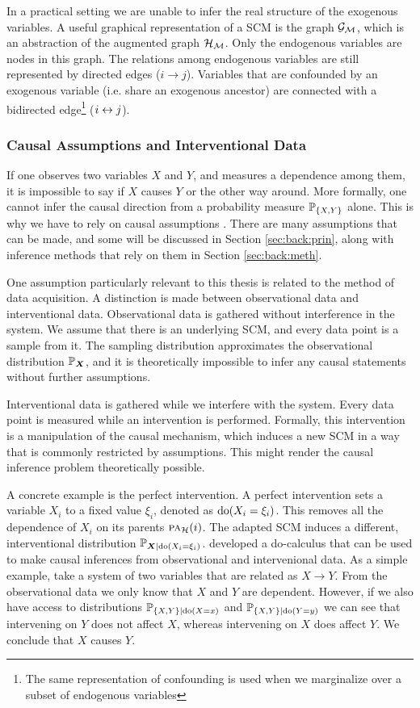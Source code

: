 In a practical setting we are unable to infer the real structure of the exogenous variables. A useful graphical representation of a SCM is the graph $\mathcal{G}_{\mathcal{M}}$, which is an abstraction of the augmented graph $\mathcal{H}_{\mathcal{M}}$. Only the endogenous variables are nodes in this graph. The relations among endogenous variables are still represented by directed edges ($i \to j$). Variables that are confounded by an exogenous variable (i.e. share an exogenous ancestor) are connected with a bidirected edge\footnote{The same representation of confounding is used when we marginalize over a subset of endogenous variables} ($i\leftrightarrow j$).

\subsubsection{Causal Assumptions and Interventional Data}
If one observes two variables $X$ and $Y$, and measures a dependence among them, it is impossible to say if $X$ causes $Y$ or the other way around. More formally, one cannot infer the causal direction from a probability measure $\mathbb{P}_{\{X,Y\}}$ alone. This is why we have to rely on causal assumptions \citep{pearl2009causality}. There are many assumptions that can be made, and some will be discussed in Section \ref{sec:back:prin}, along with inference methods that rely on them in Section \ref{sec:back:meth}. 

One assumption particularly relevant to this thesis is related to the method of data acquisition. A distinction is made between observational data and interventional data. Observational data is gathered without interference in the system. We assume that there is an underlying SCM, and every data point is a sample from it. The sampling distribution approximates the observational distribution $\mathbb{P}_{\bm{X}}$, and it is theoretically impossible to infer any causal statements without further assumptions. 

Interventional data is gathered while we interfere with the system. Every data point is measured while an intervention is performed. Formally, this intervention is a manipulation of the causal mechanism, which induces a new SCM in a way that is commonly restricted by assumptions. This might render the causal inference problem theoretically possible. 

A concrete example is the perfect intervention. A perfect intervention sets a variable $X_i$ to a fixed value $\xi_i$, denoted as $\mathrm{do}(X_i=\xi_i)$. This removes all the dependence of $X_i$ on its parents $\text{\normalfont\scshape pa}_{\mathcal{H}}(i)$. The adapted SCM induces a different, interventional distribution $\mathbb{P}_{\bm{X}|\mathrm{do}(X_i=\xi_i)}$. \citet{pearl2009causality} developed a do-calculus that can be used to make causal inferences from observational and intervenional data. As a simple example, take a system of two variables that are related as $X\to Y$. From the observational data we only know that $X$ and $Y$ are dependent. However, if we also have access to distributions $\mathbb{P}_{\{X,Y\}|\mathrm{do}(X=x)}$ and $\mathbb{P}_{\{X,Y\}|\mathrm{do}(Y=y)}$ we can see that intervening on $Y$ does not affect $X$, whereas intervening on $X$ does affect $Y$. We conclude that $X$ causes $Y$. 


